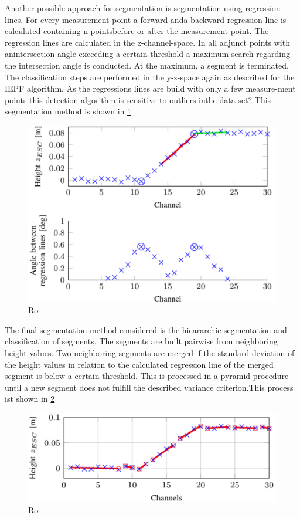 \documentclass[conference]{IEEEtran}
\begin{document}
Another possible approach for segmentation is segmentation using regression lines. For every measurement point a forward anda backward regression line is calculated containing n pointsbefore or after the measurement point. The regression lines are calculated in the z-channel-space.  In all adjunct points with anintersection angle exceeding a certain threshold a maximum search regarding the intersection angle is conducted. At the maximum, a segment is terminated. The classification steps are performed in the y-z-space again as described for the IEPF algorithm. As the regressions lines are build with only a few measure-ment points this detection algorithm is sensitive to outliers inthe data set? This segmentation method is shown in \ref{fig3}

\begin{figure}[ht]
	\centering
  \includegraphics[scale = 0.5]{pictures/iepf2.pdf}
	\caption{Ro}
	\label{fig3}
\end{figure}

The final segmentation method considered is the hieararchic segmentation and classification of segments. The segments are built pairwise from neighboring height values. Two neighboring segments are merged if the standard deviation of the height values in relation to the calculated regression line of the merged segment is below a certain threshold. This is processed in a pyramid procedure until a new segment does not fulfill the described variance criterion.This process ist shown in \ref{fig4}

\begin{figure}[ht]
	\centering
  \includegraphics[scale = 0.55]{pictures/iepf3.pdf}
	\caption{Ro}
	\label{fig4}
\end{figure}
\end{document}
